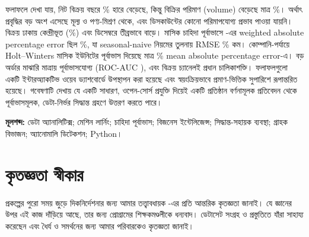 ফলাফলে দেখা যায়, নিট বিক্রয় বছরে \CAGRSales\% হারে বেড়েছে, কিন্তু বিক্রির পরিমাণ (volume) বেড়েছে মাত্র \CAGRUnits\%।
অর্থাৎ প্রবৃদ্ধির বড় অংশ এসেছে মূল্য ও পণ্য-মিশ্রণ থেকে, এবং ডিসকাউন্টের কোনো পরিমাপযোগ্য প্রভাব পাওয়া যায়নি। বিক্রয় ঢাকায়
কেন্দ্রীভূত (\DhakaShare\%) এবং ডিসেম্বরে তীব্রভাবে বাড়ে। মাসিক চাহিদা পূর্বাভাসে \BestReg-এর weighted absolute percentage
error ছিল \BestRegWAPE\%, যা seasonal-naive নিয়মের তুলনায় RMSE \GainVsSNaive\% কম। কোম্পানি-পর্যায়ে Holt--Winters মাসিক
ইউনিটের পূর্বাভাস দিয়েছে মাত্র \HWMAPE\% mean absolute percentage error-এ। বড় অর্ডার মাঝারি মাত্রায় পূর্বাভাসযোগ্য
(ROC-AUC \ClsAUC), এবং বিক্রয় চ্যানেলই প্রধান চালিকাশক্তি। ফলাফলগুলো একটি ইন্টারঅ্যাকটিভ ওয়েব ড্যাশবোর্ডে উপস্থাপন
করা হয়েছে এবং স্বয়ংক্রিয়ভাবে প্রমাণ-ভিত্তিক সুপারিশে রূপান্তরিত হয়েছে। গবেষণাটি দেখায় যে একটি সাধারণ, ওপেন-সোর্স প্রযুক্তি
দিয়েই একটি প্রতিষ্ঠান বর্ণনামূলক প্রতিবেদন থেকে পূর্বাভাসমূলক, ডেটা-নির্ভর সিদ্ধান্ত গ্রহণে উত্তরণ করতে পারে।

\vspace{4mm}
\noindent\textbf{মূলশব্দ:} ডেটা অ্যানালিটিক্স; মেশিন লার্নিং; চাহিদা পূর্বাভাস; বিজনেস ইন্টেলিজেন্স; সিদ্ধান্ত-সহায়ক
ব্যবস্থা; গ্রাহক বিভাজন; অ্যানোমালি ডিটেকশন; Python।

\chapter*{কৃতজ্ঞতা স্বীকার}
প্রকল্পের পুরো সময় জুড়ে দিকনির্দেশনার জন্য আমার তত্ত্বাবধায়ক \Supervisor-এর প্রতি আন্তরিক কৃতজ্ঞতা জানাই। যে জ্ঞানের উপর
এই কাজ দাঁড়িয়ে আছে, তার জন্য \Programme{} প্রোগ্রামের শিক্ষকমণ্ডলীকে ধন্যবাদ। ডেটাসেট সংগ্রহ ও প্রস্তুতিতে যাঁরা সাহায্য
করেছেন এবং ধৈর্য ও সমর্থনের জন্য আমার পরিবারকেও কৃতজ্ঞতা জানাই।
